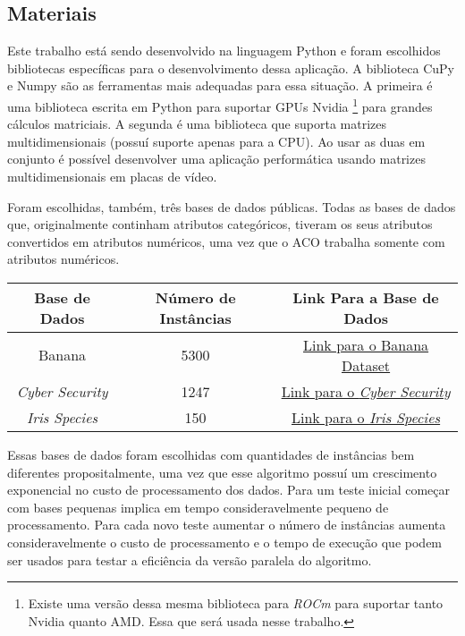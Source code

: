 \subsection{Materiais} \label{Materiais}

Este trabalho está sendo desenvolvido na linguagem Python e foram escolhidos bibliotecas
específicas para o desenvolvimento dessa aplicação.
A biblioteca CuPy\cite{cupyLib} e Numpy\cite{numpyLib} são as ferramentas mais adequadas
para essa situação. A primeira é uma biblioteca escrita em Python para suportar GPUs Nvidia
\footnote[1]{Existe uma versão dessa mesma biblioteca para \emph{ROCm} para suportar tanto Nvidia quanto AMD. Essa que será usada nesse trabalho.}
para grandes cálculos matriciais. A segunda é uma biblioteca que suporta matrizes multidimensionais
(possuí suporte apenas para a CPU). Ao usar as duas em conjunto é possível desenvolver uma aplicação
performática usando matrizes multidimensionais em placas de vídeo.

Foram escolhidas, também, três bases de dados públicas.
Todas as bases de dados que, originalmente continham atributos categóricos, tiveram os
seus atributos convertidos em atributos numéricos, uma vez que o ACO trabalha
somente com atributos numéricos.

\begin{center}
    \begin{tabular}{|c|c|c|}
        \hline
        Base de Dados & Número de Instâncias & Link Para a Base de Dados \\
        \hline
        Banana & 5300 & \href{https://www.kaggle.com/datasets/saranchandar/standard-classification-banana-dataset}{Link para o Banana Dataset} \\
        \hline
        \emph{Cyber Security} & 1247 & \href{https://www.kaggle.com/datasets/deepcontractor/cyber-security-salaries}{Link para o \emph{Cyber Security}} \\
        \hline
        \emph{Iris Species} & 150 & \href{https://www.kaggle.com/datasets/uciml/iris}{Link para o \emph{Iris Species}} \\
        \hline
    \end{tabular}
\end{center}

Essas bases de dados foram escolhidas com quantidades de instâncias bem diferentes propositalmente, uma vez
que esse algoritmo possuí um crescimento exponencial no custo de processamento dos dados. Para um teste inicial
começar com bases pequenas implica em tempo consideravelmente pequeno de processamento. Para cada novo teste
aumentar o número de instâncias aumenta consideravelmente o custo de processamento e o tempo de execução que
podem ser usados para testar a eficiência da versão paralela do algoritmo.

